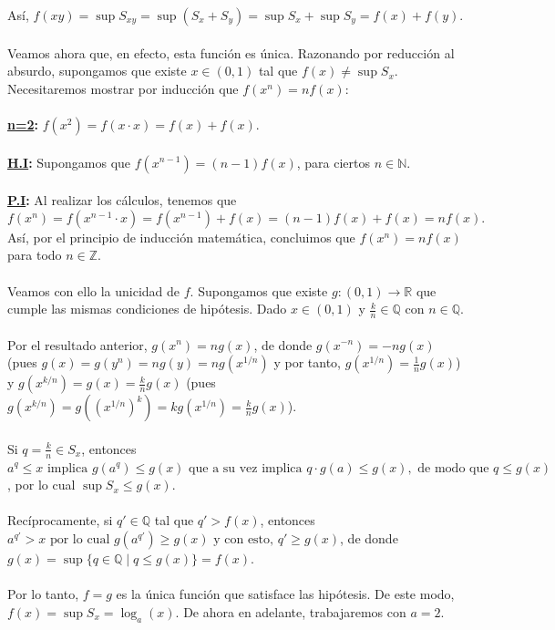 \documentclass{article}
\begin{document}
Así, $f(xy) = \sup S_{xy} = \sup(S_x + S_y) = \sup S_x + \sup S_y = f(x) + f(y)$. \\ \\
Veamos ahora que, en efecto, esta función es única. Razonando por reducción al absurdo, supongamos que existe $x \in (0,1)$ tal que $f(x) \neq \sup S_x$. Necesitaremos mostrar por inducción que $f(x^n) = n f(x)$: \\ \\
\textbf{\underline{n=2}:} $f(x^2) = f(x \cdot x) = f(x) + f(x)$. \\ \\
\textbf{\underline{H.I}:} Supongamos que $f(x^{n-1}) = (n-1)f(x)$, para ciertos $n \in \mathbb{N}$. \\ \\
\textbf{\underline{P.I}:} Al realizar los cálculos, tenemos que \[ f(x^n) = f(x^{n-1} \cdot x) = f(x^{n-1}) + f(x) = (n-1)f(x) + f(x) = nf(x). \] Así, por el principio de inducción matemática, concluimos que $f(x^n) = nf(x)$ para todo $n \in \mathbb{Z}$. \\ \\
Veamos con ello la unicidad de $f$. Supongamos que existe $g: (0,1) \longrightarrow \mathbb{R}$ que cumple las mismas condiciones de hipótesis. Dado $x \in (0, 1)$ y $\frac{k}{n} \in \mathbb{Q}$ con $n \in \mathbb{Q}$. \\ \\
Por el resultado anterior, $g(x^n) = ng(x)$, de donde $g(x^{-n}) = -ng(x)$ (pues $g(x) = g(y^n) = n g(y) = n g(x^{1/n})$ y por tanto,  $ g(x^{1/n}) = \frac{1}{n} g(x)$) y
$g(x^{k/n}) = g(x) = \frac{k}{n} g(x)$ (pues $g(x^{k/n}) = g((x^{1/n})^k) = k g(x^{1/n}) = \frac{k}{n} g(x)$). \\ \\
Si
$q = \frac{k}{n} \in S_x$, entonces
$a^q \leq x \text{ implica } g(a^q) \leq g(x) \text{ que a su vez implica } q \cdot g(a) \leq g(x), \text{ de modo que } q \leq g(x)$, por lo cual
$\sup S_x \leq g(x)$. \\ \\
Recíprocamente, si
$q' \in \mathbb{Q}$ tal que
$q' > f(x)$, entonces
$a^{q'} > x \text{ por lo cual } g(a^{q'}) \geq g(x) \text{ y con esto, } q' \geq g(x)$, de donde
$g(x) = \sup \{ q \in \mathbb{Q} \mid q \leq g(x) \} = f(x)$. \\ \\
Por lo tanto,
$f = g$ es la única función que satisface las hipótesis. De este modo, $f(x) = \sup S_x = \log_a(x)$. De ahora en adelante, trabajaremos con $a=2$. \\ \\
\end{document}
